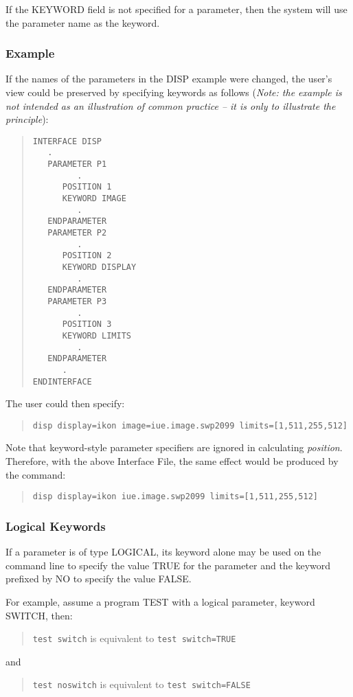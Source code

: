 \documentclass[twoside,11pt]{article}
\renewcommand{\_}{\texttt{\symbol{95}}}
\begin{document}
If the KEYWORD field is not specified for a parameter, then the system will
use the parameter name as the keyword.

\subsubsection*{Example}
If the names of the parameters in the DISP example were changed,
the user's view could be preserved by specifying keywords as follows
({\em Note: the example is not intended as an
illustration of common practice -- it is only to illustrate the
principle}\/):
\begin{quote} \begin{verbatim}
INTERFACE DISP
   .
   PARAMETER P1
         .
      POSITION 1
      KEYWORD IMAGE
         .
   ENDPARAMETER
   PARAMETER P2
         .
      POSITION 2
      KEYWORD DISPLAY
         .
   ENDPARAMETER
   PARAMETER P3
         .
      POSITION 3
      KEYWORD LIMITS
         .
   ENDPARAMETER
      .
ENDINTERFACE
\end{verbatim} \end{quote}
The user could then specify:
\begin{quote} \begin{verbatim}
disp display=ikon image=iue.image.swp2099 limits=[1,511,255,512]
\end{verbatim} \end{quote}
Note that keyword-style parameter specifiers are ignored in calculating
{\em position}.
Therefore, with the above Interface File, the same effect would be produced
by the command:
\begin{quote} \begin{verbatim}
disp display=ikon iue.image.swp2099 limits=[1,511,255,512]
\end{verbatim} \end{quote}

\subsubsection*{Logical Keywords}
If a parameter is of type \_LOGICAL, its keyword alone may be used on
the command line to specify the value TRUE for the parameter and the
keyword prefixed by NO to specify the value FALSE.

For example, assume a program TEST with a logical parameter, keyword
SWITCH, then:
\begin{quote}
\texttt{test switch} is equivalent to \texttt{test switch=TRUE}
\end{quote}
and
\begin{quote}
\texttt{test noswitch} is equivalent to \texttt{test switch=FALSE}
\end{quote}
\end{document}
